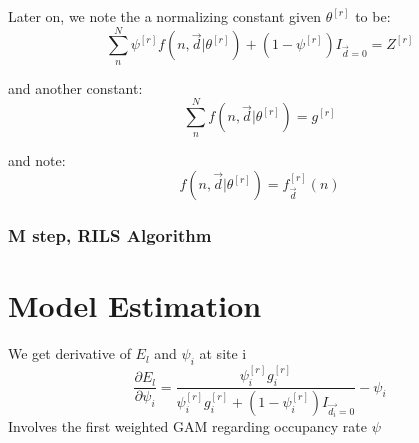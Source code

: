 \documentclass[]{article}
\begin{document}
Later on, we note the a normalizing constant given $\theta^{[r]}$ to be:
\[
\sum_{n}^{N}\psi^{[r]}f(n,\vec{d}|\theta^{[r]})+(1-\psi^{[r]})I_{\vec{d}=0}=Z^{[r]}
\]

and another constant:
\[
\sum_{n}^{N}f(n,\vec{d}|\theta^{[r]})=g^{[r]}
\]

and note:
\[
f(n,\vec{d}|\theta^{[r]})=f^{[r]}_{\vec{d}}(n)
\]

\subsubsection{M step, RILS Algorithm}

\section{Model Estimation}
We get derivative of $E_{l}$ and $\psi_{i}$ at site i
\begin{equation}
	\frac{\partial E_{l}}{\partial \psi_{i}}=\frac{\psi_{i}^{[r]}g_{i}^{[r]}}{\psi_{i}^{[r]}g_{i}^{[r]}+(1-\psi_{i}^{[r]})I_{\vec{d_{i}}=0}}-\psi_{i}
\end{equation}
Involves the first weighted GAM regarding occupancy rate $\psi$
\end{document}
